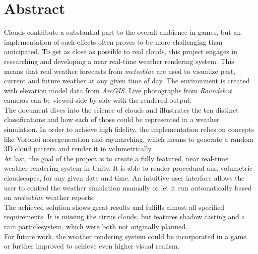 \section*{Abstract}
Clouds contribute a substantial part to the overall ambience in games, but an implementation of such effects often proves to be more challenging than anticipated.
To get as close as possible to real clouds, this project engages in researching and developing a near real-time weather rendering system.
This means that real weather forecasts from \emph{meteoblue} are used to visualize past, current and future weather at any given time of day.
The environment is created with elevation model data from \emph{ArcGIS}. Live photographs from \emph{Roundshot} cameras can be viewed side-by-side with the rendered output.
\\
The document dives into the science of clouds and illustrates the ten distinct classifications and how each of those could be represented in a weather simulation. 
In order to achieve high fidelity, the implementation relies on concepts like Voronoi \gls{noisegeneration} and \gls{raymarching}, which means to generate a random 3D cloud pattern and render it in volumetrically.
\\
At last, the goal of the project is to create a fully featured, near real-time weather rendering system in Unity.
It is able to render \gls{procedural} and volumetric cloudscapes, for any given date and time.
An intuitive user interface allows the user to control the weather simulation manually or let it run automatically based on \emph{meteoblue} weather reports.
\\
The achieved solution shows great results and fulfills almost all specified requirements.
It is missing the cirrus clouds, but features shadow casting and a rain \gls{particlesystem}, which were both not originally planned.
\\
For future work, the weather rendering system could be incorporated in a game or further improved to achieve even higher visual realism.